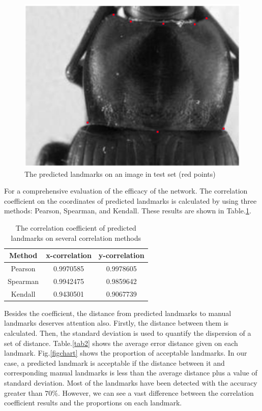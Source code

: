 \documentclass[conference]{IEEEtran}
\begin{document}
\begin{figure}[htbp]
	\centerline{\includegraphics[scale=0.18]{images/plandmark}}
	\caption{The predicted landmarks on an image in test set (red points)}
	\label{figrsexample}
\end{figure}
For a comprehensive evaluation of the efficacy of the network. The correlation coefficient on the coordinates of predicted landmarks is calculated by using three methods: Pearson\cite{pallant2013spss}, Spearman\cite{myers2010research}, and Kendall\cite{kendall1938new}. These results are shown in Table.\ref{tab1}.
\begin{table}[htbp]
\caption{The correlation coefficient of predicted landmarks on several correlation methods}
\begin{center}
\begin{tabular}{|c|c|c|}
\hline
\textbf{Method} & \textbf{x-correlation} & \textbf{y-correlation} \\ \hline
Pearson & 0.9970585 & 0.9978605 \\ \hline
Spearman & 0.9942475 & 0.9859642 \\ \hline
Kendall & 0.9430501 & 0.9067739 \\ \hline
\end{tabular}
\label{tab1}
\end{center}
\end{table}

Besides the coefficient, the distance from predicted landmarks to manual landmarks deserves attention also. Firstly, the distance between them is calculated. Then, the standard deviation\cite{bland1996statistics} is used to quantify the dispersion of a set of distance. Table.\ref{tab2} shows the average error distance given on each landmark. Fig.\ref{figchart} shows the proportion of acceptable landmarks. In our case, a predicted landmark is acceptable if the distance between it and corresponding manual landmarks is less than the average distance plus a value of standard deviation. Most of the landmarks have been detected with the accuracy greater than $70\%$. However, we can see a vast difference between the correlation coefficient results and the proportions on each landmark.
\end{document}
